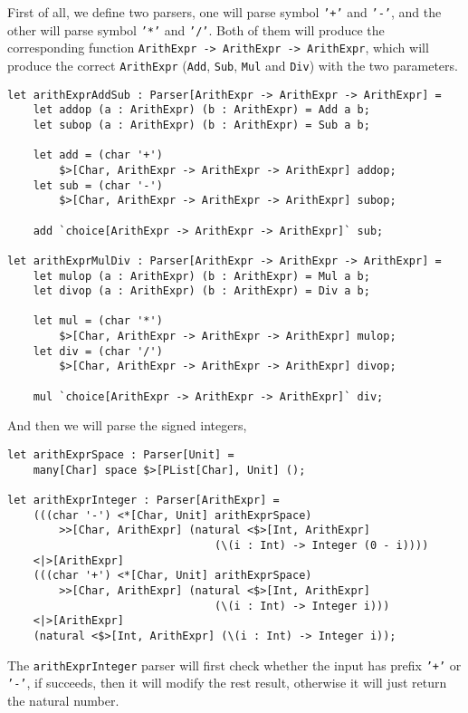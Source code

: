 First of all, we define two parsers, one will parse symbol \texttt{'+'} and \texttt{'-'}, and the other will parse symbol \texttt{'*'} and \texttt{'/'}. Both of them will produce the corresponding function \texttt{ArithExpr -> ArithExpr -> ArithExpr}, which will produce the correct \texttt{ArithExpr} (\texttt{Add}, \texttt{Sub}, \texttt{Mul} and \texttt{Div}) with the two parameters.

\begin{lstlisting}
let arithExprAddSub : Parser[ArithExpr -> ArithExpr -> ArithExpr] =
    let addop (a : ArithExpr) (b : ArithExpr) = Add a b;
    let subop (a : ArithExpr) (b : ArithExpr) = Sub a b;

    let add = (char '+')
        $>[Char, ArithExpr -> ArithExpr -> ArithExpr] addop;
    let sub = (char '-')
        $>[Char, ArithExpr -> ArithExpr -> ArithExpr] subop;

    add `choice[ArithExpr -> ArithExpr -> ArithExpr]` sub;

let arithExprMulDiv : Parser[ArithExpr -> ArithExpr -> ArithExpr] =
    let mulop (a : ArithExpr) (b : ArithExpr) = Mul a b;
    let divop (a : ArithExpr) (b : ArithExpr) = Div a b;

    let mul = (char '*')
        $>[Char, ArithExpr -> ArithExpr -> ArithExpr] mulop;
    let div = (char '/')
        $>[Char, ArithExpr -> ArithExpr -> ArithExpr] divop;

    mul `choice[ArithExpr -> ArithExpr -> ArithExpr]` div;
\end{lstlisting}

And then we will parse the signed integers,

\begin{lstlisting}
let arithExprSpace : Parser[Unit] =
    many[Char] space $>[PList[Char], Unit] ();

let arithExprInteger : Parser[ArithExpr] =
    (((char '-') <*[Char, Unit] arithExprSpace)
        >>[Char, ArithExpr] (natural <$>[Int, ArithExpr]
                                (\(i : Int) -> Integer (0 - i))))
    <|>[ArithExpr]
    (((char '+') <*[Char, Unit] arithExprSpace)
        >>[Char, ArithExpr] (natural <$>[Int, ArithExpr]
                                (\(i : Int) -> Integer i)))
    <|>[ArithExpr]
    (natural <$>[Int, ArithExpr] (\(i : Int) -> Integer i));
\end{lstlisting}

The \texttt{arithExprInteger} parser will first check whether the input has prefix \texttt{'+'} or \texttt{'-'}, if succeeds, then it will modify the rest result, otherwise it will just return the natural number.

